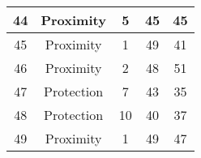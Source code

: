 \documentclass[results.tex]{subfiles}
\begin{document}
\begin{center}
\begin{tabular}{| c || c | c | c | c |}
            \hline
            44                      & Proximity                    & 5                      & 45                      & 45                   \\
            \hline
            45                      & Proximity                    & 1                      & 49                      & 41                   \\
            \hline
            46                      & Proximity                    & 2                      & 48                      & 51                   \\
            \hline
            47                      & Protection                   & 7                      & 43                      & 35                   \\
            \hline
            48                      & Protection                   & 10                     & 40                      & 37                   \\
            \hline
            49                      & Proximity                    & 1                      & 49                      & 47                   \\
            \hline
        \end{tabular}
    \end{center}
\end{document}

